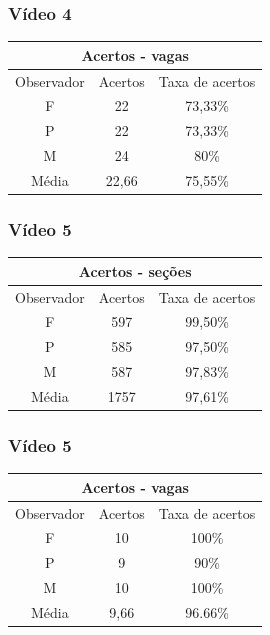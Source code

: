 \documentclass{beamer}
\begin{document}
\begin{frame}
\frametitle{Vídeo 4}
\begin{center}
\begin{tabular}{|c||c||c|}
\hline
\multicolumn{3}{|c|}{Acertos - vagas}  \\ \hline \hline
Observador & Acertos & Taxa de acertos \\ \hline
F & 22 & 73,33\% \\  \hline
P & 22 & 73,33\% \\ \hline
M & 24 & 80\% \\ \hline
Média & 22,66 & 75,55\% \\
\hline
\end{tabular}
\end{center}
\end{frame}


\begin{frame}
	\frametitle{Vídeo 5}
\begin{center}
\begin{tabular}{|c||c||c|}
\hline
\multicolumn{3}{|c|}{Acertos - seções}  \\ \hline
Observador & Acertos & Taxa de acertos \\ \hline
F & 597 & 99,50\% \\  \hline
P & 585 & 97,50\% \\ \hline
M & 587 & 97,83\% \\ \hline
Média & 1757 & 97,61\% \\
\hline
\end{tabular}
\end{center}
\end{frame}

\begin{frame}
\frametitle{Vídeo 5}
\begin{center}
\begin{tabular}{|c||c||c|}
\hline
\multicolumn{3}{|c|}{Acertos - vagas}  \\ \hline \hline
Observador & Acertos & Taxa de acertos \\ \hline
F & 10 & 100\% \\  \hline
P & 9 & 90\% \\ \hline
M & 10 & 100\% \\ \hline
Média & 9,66 & 96.66\% \\
\hline
\end{tabular}
\end{center}
\end{frame}
\end{document}
